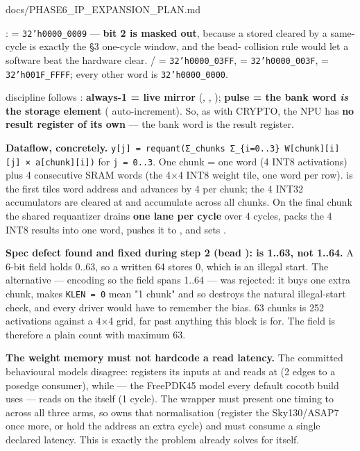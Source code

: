 \begin{relocated}{docs/PHASE6_IP_EXPANSION_PLAN.md}
{}

:  = \texttt{32'h0000\_\allowbreak{}0009} ---
\textbf{bit 2 is masked out}, because a stored  cleared by a
same-cycle  is exactly the §3 one-cycle window, and the
bead- collision rule would let a software  beat the
hardware clear. / =
\texttt{32'h0000\_\allowbreak{}03FF},  =
\texttt{32'h0000\_\allowbreak{}003F},  =
\texttt{32'h001F\_\allowbreak{}FFFF}; every other word is
\texttt{32'h0000\_\allowbreak{}0000}.

 discipline follows :
\textbf{always-1 = live mirror} (, ,
); \textbf{pulse = the bank word \emph{is} the storage
element} ( auto-increment). So, as with CRYPTO, the NPU has
\textbf{no result register of its own} --- the bank word is the result
register.

\textbf{Dataflow, concretely.}
\texttt{y[j]\ =\allowbreak{}\ requant(Σ\_\allowbreak{}chunks\ Σ\_\allowbreak{}\{i=\allowbreak{}0.\allowbreak{}.\allowbreak{}3\}\ W[chunk][i][j]\ ×\ a[chunk][i])}
for \texttt{j\ =\allowbreak{}\ 0.\allowbreak{}.\allowbreak{}3}. One
chunk = one  word (4 INT8 activations) plus 4 consecutive SRAM
words (the 4×4 INT8 weight tile, one word per row).  is
the first tile\textquotesingle s word address and advances by 4 per
chunk; the 4 INT32 accumulators are cleared at  and
accumulate across all  chunks. On the final chunk the shared
requantizer drains \textbf{one lane per cycle} over 4 cycles, packs the
4 INT8 results into one word, pushes it to , and sets
.

\warn{} \textbf{Spec defect found and fixed during step 2 (bead
):  is 1..63, not 1..64.} A 6-bit field holds
0..63, so a written 64 stores 0, which is an illegal start. The
alternative --- encoding  so the field spans 1..64 --- was
rejected: it buys one extra chunk, makes
\texttt{KLEN\ =\allowbreak{}\ 0} mean "1 chunk" and so destroys the
natural illegal-start check, and every driver would have to remember the
bias. 63 chunks is 252 activations against a 4×4 grid, far past anything
this block is for. The field is therefore a plain count with maximum 63.

\warn{} \textbf{The weight memory must not hardcode a read latency.} The
committed behavioural models disagree:
 registers its inputs at
 and reads at  (2 edges to a posedge
consumer), while  --- the FreePDK45
model every default cocotb build uses --- reads on the 
itself (1 cycle). The wrapper must present one timing to 
across all three arms, so  owns that
normalisation (register the Sky130/\allowbreak{}ASAP7  once
more, or hold the address an extra cycle) and  must
consume a single declared latency. This is exactly the
 problem  already solves for
itself.


\end{relocated}
